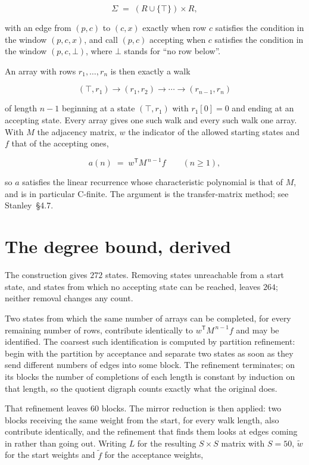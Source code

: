 \documentclass[11pt]{article}
\theoremstyle{definition}
\begin{document}
\[\Sigma \;=\; (R \cup \{\top\}) \times R,\]

with an edge from $(p,c)$ to $(c,x)$ exactly when row $c$ satisfies the condition in the window $(p,c,x)$, and call $(p,c)$ accepting when $c$ satisfies the condition in the window $(p,c,\bot)$, where $\bot$ stands for ``no row below''.

An array with rows $r_1,\dots,r_n$ is then exactly a walk

\[(\top,r_1) \to (r_1,r_2) \to \cdots \to (r_{n-1},r_n)\]

of length $n-1$ beginning at a state $(\top,r_1)$ with $r_1[0]=0$ and ending at an accepting state. Every array gives one such walk and every such walk one array. With $M$ the adjacency matrix, $w$ the indicator of the allowed starting states and $f$ that of the accepting ones,

\[a(n) \;=\; w^{\mathsf T} M^{\,n-1} f \qquad (n \ge 1),\]

so $a$ satisfies the linear recurrence whose characteristic polynomial is that of $M$, and is in particular C-finite. The argument is the transfer-matrix method; see Stanley~\S4.7.

\section{The degree bound, derived}

The construction gives $272$ states. Removing states unreachable from a start state, and states from which no accepting state can be reached, leaves $264$; neither removal changes any count.

Two states from which the same number of arrays can be completed, for every remaining number of rows, contribute identically to $w^{\mathsf T}M^{\,n-1}f$ and may be identified. The coarsest such identification is computed by partition refinement: begin with the partition by acceptance and separate two states as soon as they send different numbers of edges into some block. The refinement terminates; on its blocks the number of completions of each length is constant by induction on that length, so the quotient digraph counts exactly what the original does.

That refinement leaves $60$ blocks. The mirror reduction is then applied: two blocks receiving the same weight from the start, for every walk length, also contribute identically, and the refinement that finds them looks at edges coming in rather than going out. Writing $L$ for the resulting $S \times S$ matrix with $S = 50$, $\tilde w$ for the start weights and $\tilde f$ for the acceptance weights,
\end{document}
